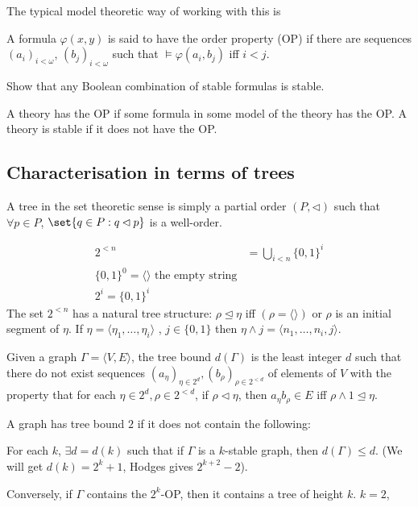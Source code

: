 \documentclass{article}
\let\models\vDash
\begin{document}
The typical model theoretic way of working with this is
\begin{defi}
  A formula $\varphi(x,y)$ is said to have the order property (OP) if there are sequences $(a_i)_{i < \omega}$, $(b_j)_{i < \omega}$ such that $\models \varphi(a_i,b_j)$ iff $i < j$.
\end{defi}
\begin{ex}
  Show that any Boolean combination of stable formulas is stable.
\end{ex}
\begin{defi}
  A theory has the OP if some formula in some model of the theory has the OP.
  A theory is stable if it does not have the OP.
\end{defi}
\subsection{Characterisation in terms of trees}
A tree in the set theoretic sense is simply a partial order $(P, \lhd)$ such that $\forall p \in P$, $\set{q \in P: q \lhd p}$ is a well-order.
\begin{notation}
  \begin{align*}
    2^{< n} &= \bigcup_{i < n} \{0,1\}^i \\
    \{0,1\}^0 = \langle \rangle \text{ the empty string}\\
    2^i = \{0,1\}^i
  \end{align*}
  The set $2^{< n}$ has a natural tree structure: $\rho \unlhd \eta$ iff $(\rho = \langle \rangle)$ or $\rho$ is an initial segment of $\eta$.
  If $\eta = \langle \eta_1, \dotsc, \eta_i \rangle$ , $j \in \{0,1\}$ then $\eta \wedge j = \langle n_1, \dotsc, n_i, j\rangle$.
\end{notation}
\begin{defi}
  Given a graph $\Gamma = \langle V, E \rangle$, the tree bound $d(\Gamma)$ is the least integer $d$ such that there do not exist sequences $(a_\eta)_{\eta \in 2^d}, (b_\rho)_{\rho \in 2^{<d}}$ of elements of $V$ with the property that for each $\eta \in 2^d, \rho \in 2^{< d}$, if $\rho \lhd \eta$, then $a_\eta b_\rho \in E$ iff $\rho \wedge 1 \unlhd \eta$.
\end{defi}
\begin{eg}
  A graph has tree bound $2$ if it does not contain the following:
\end{eg}
\begin{thm}
  For each $k$, $\exists d = d(k)$ such that if $\Gamma$ is a $k$-stable graph, then $d(\Gamma) \leq d$.
  (We will get $d(k) = 2^k + 1$, Hodges gives $2^{k+2} - 2$).
\end{thm}
Conversely, if $\Gamma$ contains the $2^k$-OP, then it contains a tree of height $k$.
$k=2$, %
\end{document}
